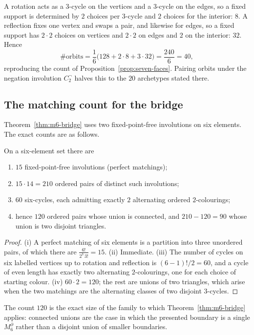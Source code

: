 A rotation acts as a $3$-cycle on the vertices and a $3$-cycle on the edges, so a fixed support
is determined by $2$ choices per $3$-cycle and $2$ choices for the interior: $8$.  A reflection
fixes one vertex and swaps a pair, and likewise for edges, so a fixed support has
$2\cdot2$ choices on vertices and $2\cdot2$ on edges and $2$ on the interior: $32$.
Hence
\[
  \#\text{orbits}=\frac{1}{6}\bigl(128+2\cdot8+3\cdot32\bigr)
  =\frac{240}{6}=40,
\]
reproducing the count of Proposition~\ref{prop:seven-faces}.  Pairing orbits under the
negation involution $C_2^{\neg}$ halves this to the $20$ archetypes stated there.

\subsection{The matching count for the bridge}

Theorem~\ref{thm:m6-bridge} uses two fixed-point-free involutions on six elements.  The exact
counts are as follows.

\begin{proposition}\label{prop:matching-counts}
On a six-element set there are
\begin{enumerate}
\item $15$ fixed-point-free involutions (perfect matchings);
\item $15\cdot14=210$ ordered pairs of distinct such involutions;
\item $60$ six-cycles, each admitting exactly $2$ alternating ordered $2$-colourings;
\item hence $120$ ordered pairs whose union is connected, and $210-120=90$ whose union is two
  disjoint triangles.
\end{enumerate}
\end{proposition}

\begin{proof}
(i) A perfect matching of six elements is a partition into three unordered pairs, of which
there are $\frac{6!}{2^{3}\,3!}=15$.  (ii) Immediate.  (iii) The number of cycles on six
labelled vertices up to rotation and reflection is $(6-1)!/2=60$, and a cycle of even length
has exactly two alternating $2$-colourings, one for each choice of starting colour.
(iv) $60\cdot2=120$; the rest are unions of two triangles, which arise when the two matchings
are the alternating classes of two disjoint $3$-cycles.
\end{proof}

The count $120$ is the exact size of the family to which
Theorem~\ref{thm:m6-bridge} applies: connected unions are the case in which the presented
boundary is a single $M_6^{\partial}$ rather than a disjoint union of smaller boundaries.

